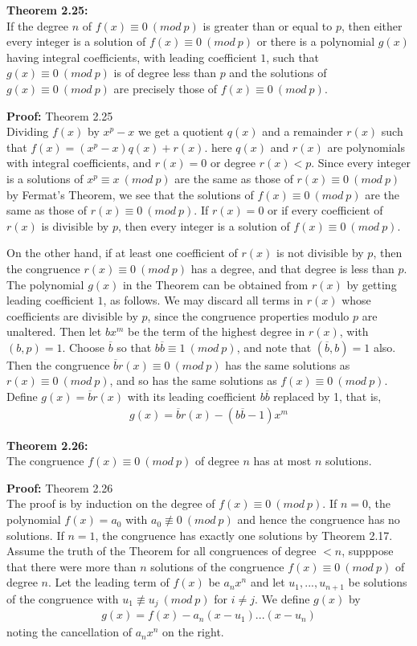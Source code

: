 \documentclass[a4paper]{article}
\begin{document}
\textbf{Theorem 2.25:}\\
If the degree $n$ of $f(x)\equiv 0\ (mod\ p)$ is greater than or equal to $p$, then either every integer is a solution of $f(x)\equiv 0\ (mod\ p)$ or there is a polynomial $g(x)$ having integral coefficients, with leading coefficient $1$, such that $g(x)\equiv 0\ (mod\ p)$ is of degree less than $p$ and the solutions of $g(x)\equiv 0\ (mod\ p)$ are precisely those of $f(x)\equiv 0\ (mod\ p)$.

\textbf{Proof:} Theorem 2.25\\
Dividing $f(x)$ by $x^p-x$ we get a quotient $q(x)$ and a remainder $r(x)$ such that $f(x)=(x^p-x)q(x)+r(x)$. here $q(x)$ and $r(x)$ are polynomials with integral coefficients, and $r(x)=0$ or degree $r(x)<p$. Since every integer is a solutions of $x^p\equiv x\ (mod\ p)$ are the same as those of $r(x)\equiv 0\ (mod\ p)$ by Fermat's Theorem, we see that the solutions of $f(x)\equiv 0\ (mod\ p)$ are the same as those of $r(x)\equiv 0\ (mod\ p)$. If $r(x)=0$ or if every coefficient of $r(x)$ is divisible by $p$, then every integer is a solution of $f(x)\equiv 0\ (mod\ p)$.

On the other hand, if at least one coefficient of $r(x)$ is not divisible by $p$, then the congruence $r(x)\equiv 0\ (mod\ p)$ has a degree, and that degree is  less than $p$. The polynomial $g(x)$ in the Theorem can be obtained from $r(x)$ by getting leading coefficient $1$, as follows. We may discard all terms in $r(x)$ whose coefficients are divisible by $p$, since the congruence properties modulo $p$ are unaltered. Then let $bx^m$ be the term of the highest degree in $r(x)$, with $(b,p)=1$. Choose $\overline{b}$ so that $b\overline{b}\equiv 1\ (mod\ p)$, and note that $(\overline{b},b)=1$ also. Then the congruence $\overline{b}r(x)\equiv 0\ (mod\ p)$ has the same solutions as $r(x)\equiv 0\ (mod\ p)$, and so has the same solutions as $f(x)\equiv 0\ (mod\ p)$. Define $g(x)=\overline{b}r(x)$ with its leading coefficient $b\overline{b}$ replaced by 1, that is,
\begin{align}
    g(x)=\overline{b}r(x)-(b\overline{b}-1)x^m
\end{align}

\textbf{Theorem 2.26:}\\
The congruence $f(x)\equiv 0\ (mod\ p)$ of degree $n$ has at most $n$ solutions.

\textbf{Proof:} Theorem 2.26\\
The proof is by induction on the degree of $f(x)\equiv 0\ (mod\ p)$. If $n=0$, the polynomial $f(x)=a_0$ with $a_0\not\equiv 0\ (mod\ p)$ and hence the congruence has no solutions. If $n=1$, the congruence has exactly one solutions by Theorem 2.17. Assume the truth of the Theorem for all congruences of degree $<n$, supppose that there were more than $n$ solutions of the congruence $f(x)\equiv 0\ (mod\ p)$ of degree $n$. Let the leading term of $f(x)$ be $a_nx^n$ and let $u_1,...,u_{n+1}$ be solutions of the congruence with $u_1\not\equiv u_j\ (mod\ p)$ for $i\neq j$. We define $g(x)$ by
\begin{align}
    g(x)=f(x)-a_n(x-u_1)...(x-u_n)
\end{align}
noting the cancellation of $a_nx^n$ on the right.
\end{document}
